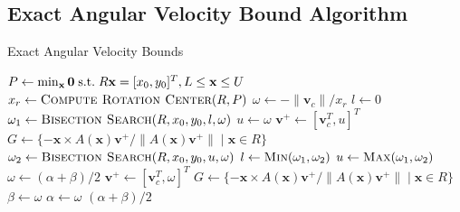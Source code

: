 \documentclass[conference]{IEEEtran}
\makeatletter
\def\BState{\State\hskip-\ALG@thistlm}
\makeatother
\begin{document}


\subsection{Exact Angular Velocity Bound
  Algorithm}\label{sec:exact-ang-vel-bound-alg}

\begin{algorithm}[t]
\caption{Exact Angular Velocity Bounds}\label{alg:angular-velocity-bounds}
\begin{algorithmic}[1]
 \Return {$[0,0]$}
\EndIf
\State $P \gets \min_\mathbf{x} \mathbf{0} \text{\;s.t.\;} R\mathbf{x} = [x_0,y_0]^T,  L \leq \mathbf{x} \leq U$ \label{line:find-pressure}
\State $x_r \gets \Call{Compute Rotation Center}{R,P}$ \label{line:find-rc}
\State $\omega \gets -\lVert\mathbf{v}_c\rVert/x_r$ \label{line:rc-to-w}
\State $l \gets 0$ \label{line:0}
\State $\omega_1 \gets \Call{Bisection Search}{R,x_0,y_0,l,\omega}$ \label{line:bisection-1}
\State $u \gets \omega$ \label{line:find-u-start}
\Do%
\State $\mathbf{v}^+ \gets [\mathbf{v}_c^T, u]^T$
\State $G \gets \{-\mathbf{x}\times A(\mathbf{x})\mathbf{v}^+ / \lVert A(\mathbf{x})\mathbf{v}^+ \rVert \;|\; \mathbf{x} \in R\}$
 \label{line:find-u-end}
\State $\omega_2 \gets \Call{Bisection Search}{R,x_0,y_0,u,\omega}$ \label{line:bisection-2}
\State $l \gets \Call{Min}{\omega_1,\omega_2}$
\State $u \gets \Call{Max}{\omega_1,\omega_2}$
\State \Return {$[l, u]$}
\EndFunction
% 
\While{$\varepsilon < |\alpha-\beta|$}
\State $\omega \gets (\alpha + \beta)/2$
\State $\mathbf{v}^+ \gets [\mathbf{v}_c^T, \omega]^T$
\State $G \gets \{-\mathbf{x}\times A(\mathbf{x})\mathbf{v}^+ / \lVert A(\mathbf{x})\mathbf{v}^+ \rVert \;|\; \mathbf{x} \in R\}$
\State $\beta \gets \omega$
\Else{} 
\State $\alpha \gets \omega$
\EndIf
\EndWhile
\State \Return $(\alpha + \beta)/2$
\EndFunction
\end{algorithmic}
\end{algorithm}
\end{document}
